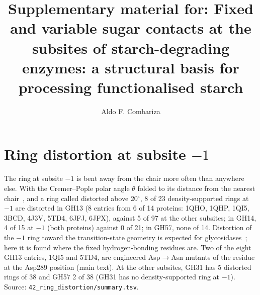 \documentclass[preprint,12pt]{elsarticle}
\begin{document}
\begin{frontmatter}
\title{Supplementary material for: Fixed and variable sugar contacts at the subsites of
starch-degrading enzymes: a structural basis for processing functionalised starch}
\author{Aldo F. Combariza}
\end{frontmatter}


\section{Ring distortion at subsite $-1$}
The ring at subsite $-1$ is bent away from the chair more often than anywhere else. With
the Cremer--Pople polar angle $\theta$ folded to its distance from the nearest
chair~\citep{Cremer1975}, and a ring called distorted above 20$^\circ$, 8 of 23
density-supported rings at $-1$ are distorted in GH13 (8 entries from 6 of 14 proteins:
1QHO, 1QHP, 1QI5, 3BCD, 4J3V, 5TD4, 6JFJ, 6JFX), against 5 of 97 at the other subsites;
in GH14, 4 of 15 at $-1$ (both proteins) against 0 of 21; in GH57, none of 14. Distortion of
the $-1$ ring toward the transition-state geometry is expected for
glycosidases~\citep{Davies2012}; here it is found where the fixed hydrogen-bonding
residues are. Two of the eight GH13 entries, 1QI5 and 5TD4, are engineered Asp$\to$Asn
mutants of the residue at the Asp289 position (main text). At the other subsites, GH31 has
5 distorted rings of 38 and GH57 2 of 38 (GH31 has no density-supported ring at $-1$).
Source: \texttt{42\_ring\_distortion/summary.tsv}.
\end{document}

